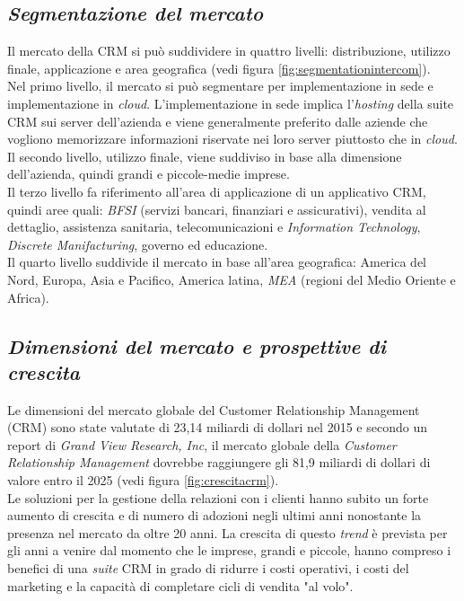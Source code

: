\documentclass[a4paper, 11pt]{article}
\begin{document}
\subsection*{\textit{Segmentazione del mercato}}
\par
Il mercato della CRM si può suddividere in quattro livelli\cite{GVR}: distribuzione, utilizzo finale, applicazione e area geografica (vedi figura \ref{fig:segmentationintercom}).\\
Nel primo livello, il mercato si può segmentare per implementazione in sede e implementazione in \textit{cloud}. 
L'implementazione in sede implica l'\textit{hosting} della suite CRM sui server dell'azienda e viene generalmente preferito dalle aziende che vogliono memorizzare informazioni riservate nei loro server piuttosto che in \textit{cloud}.\\
Il secondo livello, utilizzo finale, viene suddiviso in base alla dimensione dell'azienda, quindi grandi e piccole-medie imprese.\\
Il terzo livello fa riferimento all'area di applicazione di un applicativo CRM, quindi aree quali: \textit{BFSI} (servizi bancari, finanziari e assicurativi), vendita al dettaglio, assistenza sanitaria, telecomunicazioni e \textit{Information Technology}, \textit{Discrete Manifacturing}, governo ed educazione.\\
Il quarto livello suddivide il mercato in base all'area geografica: America del Nord, Europa, Asia e Pacifico, America latina, \textit{MEA} (regioni del Medio Oriente e Africa).

\subsection*{\textit{Dimensioni del mercato e prospettive di crescita}}
\par 
Le dimensioni del mercato globale del Customer Relationship Management (CRM) sono state valutate di 23,14 miliardi di dollari nel 2015 e secondo un report di \textit{Grand View Research, Inc}, il mercato globale della \textit{Customer Relationship Management} dovrebbe raggiungere gli 81,9 miliardi di dollari di valore entro il 2025 \cite{GVR}  (vedi figura \ref{fig:crescitacrm}). \\
Le soluzioni per la gestione della relazioni con i clienti hanno subito un forte aumento di crescita e di numero di adozioni negli ultimi anni nonostante la presenza nel mercato da oltre 20 anni. La crescita di questo \textit{trend} è prevista per gli anni a venire dal momento che le imprese, grandi e piccole, hanno compreso i benefici di una \textit{suite} CRM in grado di ridurre i costi operativi, i costi del marketing e la capacità di completare cicli di vendita "al volo". 
\end{document}
